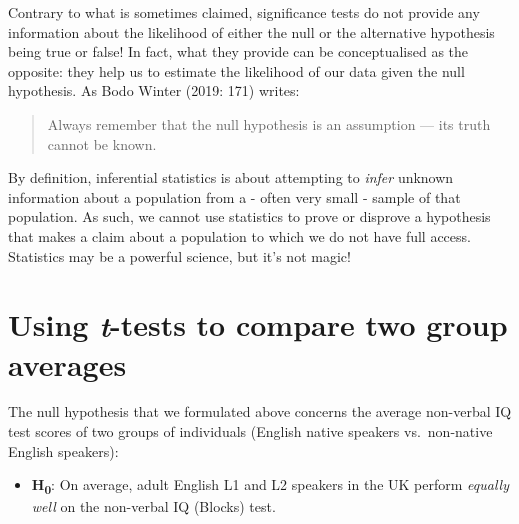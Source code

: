 \documentclass[
  letterpaper,
  DIV=11,
  numbers=noendperiod]{scrreprt}
\providecommand{\tightlist}{%
  \setlength{\itemsep}{0pt}\setlength{\parskip}{0pt}}
\begin{document}
\begin{tcolorbox}[enhanced jigsaw, arc=.35mm, bottomrule=.15mm, bottomtitle=1mm, breakable, colback=white, colbacktitle=quarto-callout-warning-color!10!white, colframe=quarto-callout-warning-color-frame, coltitle=black, left=2mm, leftrule=.75mm, opacityback=0, opacitybacktitle=0.6, rightrule=.15mm, title=\textcolor{quarto-callout-warning-color}{\faExclamationTriangle}\hspace{0.5em}{Common misconception}, titlerule=0mm, toprule=.15mm, toptitle=1mm]

Contrary to what is sometimes claimed, significance tests do not provide
any information about the likelihood of either the null or the
alternative hypothesis being true or false! In fact, what they provide
can be conceptualised as the opposite: they help us to estimate the
likelihood of our data given the null hypothesis. As Bodo Winter (2019:
171) writes:

\begin{quote}
Always remember that the null hypothesis is an assumption --- its truth
cannot be known.
\end{quote}

By definition, inferential statistics is about attempting to
\emph{infer} unknown information about a population from a - often very
small - sample of that population. As such, we cannot use statistics to
prove or disprove a hypothesis that makes a claim about a population to
which we do not have full access. Statistics may be a powerful science,
but it's not magic!~

\end{tcolorbox}

\section{\texorpdfstring{Using \emph{t}-tests to compare two group
averages}{Using t-tests to compare two group averages}}\label{sec-ttest}

The null hypothesis that we formulated above concerns the average
non-verbal IQ test scores of two groups of individuals (English native
speakers vs.~non-native English speakers):

\begin{itemize}
\tightlist
\item
  \textbf{H\textsubscript{0}}: On average, adult English L1 and L2
  speakers in the UK perform \emph{equally well} on the non-verbal IQ
  (Blocks) test.
\end{itemize}
\end{document}
